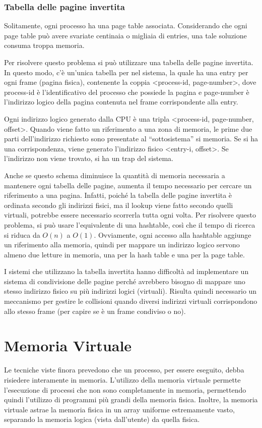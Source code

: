 \documentclass[a4paper]{article}
\begin{document}
\subsubsection{Tabella delle pagine invertita}
Solitamente, ogni processo ha una page table associata. Considerando che ogni page table può avere svariate centinaia o migliaia di entries, una tale soluzione consuma troppa memoria.

Per risolvere questo problema si può utilizzare una tabella delle pagine invertita. In questo modo, c'è un'unica tabella per nel sistema, la quale ha una entry per ogni frame (pagina fisica), contenente la coppia <process-id, page-number>, dove process-id è l'identificativo del processo che possiede la pagina e page-number è l'indirizzo logico della pagina contenuta nel frame corrispondente alla entry.

Ogni indirizzo logico generato dalla CPU è una tripla <process-id, page-number, offset>. Quando viene fatto un riferimento a una zona di memoria, le prime due parti dell'indirizzo richiesto sono presentate al ``sottosistema'' si memoria. Se si ha una corrispondenza, viene generato l'indirizzo fisico <entry-i, offset>. Se l'indirizzo non viene trovato, si ha un trap del sistema.

Anche se questo schema diminuisce la quantità di memoria necessaria a mantenere ogni tabella delle pagine, aumenta il tempo necessario per cercare un riferimento a una pagina. Infatti, poiché la tabella delle pagine invertita è ordinata secondo gli indirizzi fisici, ma il lookup viene fatto secondo quelli virtuali, potrebbe essere necessario scorrerla tutta ogni volta. Per risolvere questo problema, si può usare l'equivalente di una hashtable, così che il tempo di ricerca si riduca da $O(n)$ a $O(1)$. Ovviamente, ogni accesso alla hashtable aggiunge un riferimento alla memoria, quindi per mappare un indirizzo logico servono almeno due letture in memoria, una per la hash table e una per la page table.

I sistemi che utilizzano la tabella invertita hanno difficoltà ad implementare un sistema di condivisione delle pagine perché avrebbero bisogno di mappare uno stesso indirizzo fisico su più indirizzi logici (virtuali). Risulta quindi necessario un meccanismo per gestire le collisioni quando diversi indirizzi virtuali corrispondono allo stesso frame (per capire se è un frame condiviso o no).


\section{Memoria Virtuale}
Le tecniche viste finora prevedono che un processo, per essere eseguito, debba risiedere interamente in memoria. L'utilizzo della memoria virtuale permette l'esecuzione di processi che non sono completamente in memoria, permettendo quindi l'utilizzo di programmi più grandi della memoria fisica. Inoltre, la memoria virtuale astrae la memoria fisica in un array uniforme estremamente vasto, separando la memoria logica (vista dall'utente) da quella fisica.
\end{document}
